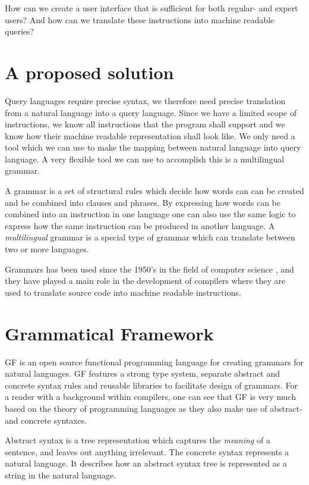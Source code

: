 How can we create a user interface that is sufficient for both regular- and expert users? And how can we translate these instructions into machine readable queries?

\section{A proposed solution}
Query languages require precise syntax, we therefore need precise translation from a natural language into a query language. Since we have a limited scope of instructions, we know all instructions that the program shall support and we know how their machine readable representation shall look like. We only need a tool which we can use to make the mapping between natural language into query language. A very flexible tool we can use to accomplish this is a multilingual grammar. 

A grammar is a set of structural rules which decide how words can can be created and be combined into clauses and phrases. By expressing how words can be combined into an instruction in one language one can also use the same logic to express how the same instruction can be produced in another language. A \emph{multilingual} grammar is a special type of grammar which can translate between two or more languages.

Grammars has been used since the 1950's in the field of computer science \cite[p. 4]{ranta:2011}, and they have played a main role in the development of compilers where they are used to translate source code into machine readable instructions.

\section{Grammatical Framework}
\ac{GF} is an open source functional programming language for creating grammars for natural languages.\cite[p. 1]{ranta:2011} GF features a strong type system, separate abstract and concrete syntax rules and reusable libraries to facilitate design of grammars. For a reader with a background within compilers, one can see that GF is very much based on the theory of programming languages as they also make use of abstract- and concrete syntaxes\cite[pp. 69-70]{Aho:1986:CPT:6448}.

Abstract syntax is a tree representation which captures the \emph{meaning} of a sentence, and leaves out anything irrelevant. The concrete syntax represents a natural language. It describes how an abstract syntax tree is represented as a string in the natural language.

